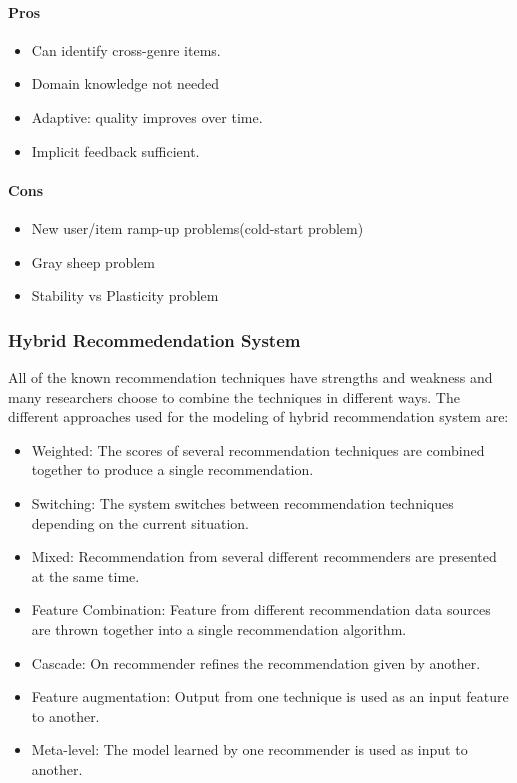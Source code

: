 \paragraph{Pros}\hfill

\begin{itemize}
	\item Can identify cross-genre items.
	\item Domain knowledge not needed
	\item Adaptive: quality improves over time.
	\item Implicit feedback sufficient.
\end{itemize}
\paragraph{Cons}\hfill

\begin{itemize}
	\item New user/item ramp-up problems(cold-start problem)
	\item Gray sheep problem
	\item Stability vs Plasticity problem
\end{itemize}
\subsubsection{Hybrid Recommedendation System}
All of the known recommendation techniques have strengths and weakness and many researchers choose to combine the techniques in different ways.
The different approaches used for the modeling of hybrid recommendation system are:
\begin{itemize}
	\item Weighted: The scores of several recommendation techniques are combined together to produce a single recommendation.
	\item Switching: The system switches between recommendation techniques depending on the current situation.
	\item Mixed: Recommendation from several different recommenders are presented at the same time.
	\item Feature Combination: Feature from different recommendation data sources are thrown together into a single recommendation algorithm.
	\item Cascade: On recommender refines the recommendation given by another.
	\item Feature augmentation: Output from one technique is used as an input feature to another.
	\item Meta-level: The model learned by one recommender is used as input to another.
\end{itemize}
